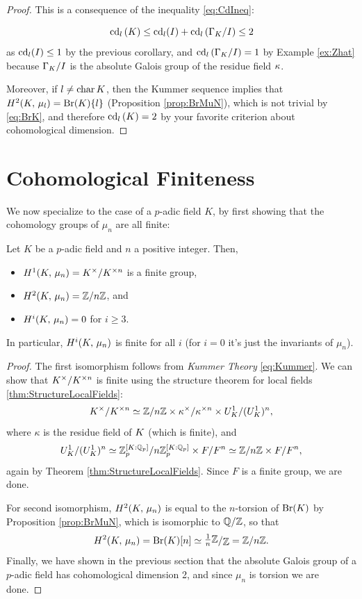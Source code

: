 \documentclass[a4paper, oneside]{memoir}
\begin{document}
\begin{proof}
    This is a consequence of the inequality \ref{eq:CdIneq}:

    \[
        \operatorname{cd}_l{(K)}\leq \operatorname{cd}_l(I)+\operatorname{cd}_l{(\Gamma_K / I)} \leq 2
    \]
    as $\operatorname{cd}_l(I)\leq 1$ by the previous corollary, and $\operatorname{cd}_l{(\Gamma_K / I)} = 1$ by Example \ref{ex:Zhat} because $\Gamma_K / I$ is the absolute Galois group of the residue
    field $\kappa$.

    Moreover, if $l\neq \operatorname{char}{K}$, then the Kummer sequence implies that $H^{2}( K, \, \mu_l )=\mathrm{Br}(K)\{l\}$ (Proposition \ref{prop:BrMuN}), which is not trivial by \eqref{eq:BrK}, and
    therefore $\operatorname{cd}_l{(K)}=2$ by your favorite criterion about cohomological dimension.
\end{proof}

\section{Cohomological Finiteness}

We now specialize to the case of a $p$-adic field $K$, by first showing that the cohomology groups of $\mu_n$ are all finite:

\begin{theorem}\label{thm:CohomMuN}
    Let $K$ be a $p$-adic field and $n$ a positive integer.
    Then,
    \begin{itemize}
        \item $H^{1}( K, \, \mu_n ) = K^\times/K^{\times n}$ is a finite group,
        \item $H^{2}( K, \, \mu_n ) = \mathbb{Z}/n\mathbb{Z}$, and
        \item $H^{i}( K, \, \mu_n ) = 0$ for $i\geq 3$.
    \end{itemize}
    In particular, $H^{i}( K, \, \mu_n )$ is finite for all $i$ (for $i=0$ it's just the invariants of $\mu_n$).
\end{theorem}
\begin{proof}
    The first isomorphism follows from \textit{Kummer Theory} \eqref{eq:Kummer}. We can show that $K^\times/K^{\times n}$ is finite using the structure theorem for local fields \ref{thm:StructureLocalFields}:
    \[
        K^\times/K^{\times n} \simeq \mathbb{Z}/n\mathbb{Z} \times \kappa^\times/\kappa^{\times n} \times U_K^1/(U_K^1)^n,
    \]
    where $\kappa$ is the residue field of $K$ (which is finite), and
    \[
        U_K^1/(U_K^1)^n \simeq \mathbb{Z}_p^{[K:\mathbb{Q}_p]}/n \mathbb{Z}_p^{[K:\mathbb{Q}_p]}
        \times F/F^n \simeq \mathbb{Z}/n\mathbb{Z} \times F/F^n
        ,\]
    again by Theorem \ref{thm:StructureLocalFields}. Since $F$ is a finite group, we are done.

    For second isomorphism, $H^{2}( K, \, \mu_n )$ is equal to the $n$-torsion of $\mathrm{Br}(K)$ by Proposition \ref{prop:BrMuN}, which is isomorphic to $\mathbb{Q}/\mathbb{Z}$, so that
    \[
        \H{2}{\K}{\mu_n} = \Br{\K}[n] \simeq \ssfrac{\frac{1}{n}\Z}{\Z} = \Z/n\Z.
    \]
    Finally, we have shown in the previous section that the absolute Galois group of a $p$-adic field has cohomological dimension 2, and since $\mu_n$ is torsion we are done.
\end{proof}
\end{document}
